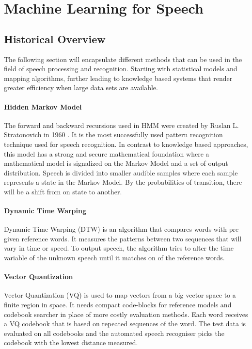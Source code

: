 \chapter{Machine Learning for Speech}\label{ch:machine_learning}

\section{Historical Overview}
The following section will encapsulate different methods that can be used in the field of speech processing and recognition. Starting with statistical models and mapping algorithms, further leading to knowledge based systems that render greater efficiency when large data sets are available.

\subsubsection{Hidden Markov Model}

The forward and backward recursions used in HMM  were created by Ruslan L. Stratonovich in 1960 \cite{stratonovich1960conditional}. 
It is the most successfully used pattern recognition technique used for speech recognition. 
In contrast to knowledge based approaches, this model has a strong and secure
mathematical foundation where a mathematical model is signalized on the Markov Model
and a set of output distribution.
Speech is divided into smaller audible samples where each sample represents a state in the Markov Model. By the probabilities of transition, there will be a shift from on state to another.\cite[p.~2]{gaikwad2010review}\cite{togneri1990speech}

\subsubsection{Dynamic Time Warping}

Dynamic Time Warping (DTW) is an algorithm that compares words with pre-given reference words.
 It measures the patterns between two sequences that will vary in time or speed.\cite{togneri1990speech}
 To output speech, the algorithm tries to alter the time variable of the unknown speech until it matches on of the reference words.

\subsubsection{Vector Quantization}

Vector Quantization (VQ) is used to map vectors from a big vector space to a finite region in space. It needs compact code-blocks for reference models and codebook searcher in place of more costly evaluation methods. Each word receives a VQ codebook that is based on repeated sequences of the word. The test data is evaluated on all codebooks and the automated speech recogniser picks the codebook with the lowest distance measured.\cite[p.~20-21]{togneri1990speech}


